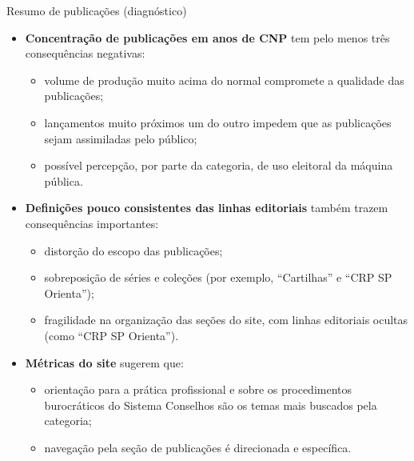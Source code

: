 \documentclass{beamer}
\begin{document}
\begin{frame}{Resumo de publicações (diagnóstico)}

	\scriptsize
	\begin{itemize}
	\item \textbf{Concentração de publicações em anos de CNP} tem pelo menos três consequências negativas:
		\begin{itemize}\scriptsize
			\item volume de produção muito acima do normal compromete a qualidade das publicações;
			\item lançamentos muito próximos um do outro impedem que as publicações sejam assimiladas pelo público;
			\item possível percepção, por parte da categoria, de uso eleitoral da máquina pública.
		\end{itemize}
	\item \textbf{Definições pouco consistentes das linhas editoriais} também trazem consequências importantes:
		\begin{itemize}\scriptsize
			\item distorção do escopo das publicações;
			\item sobreposição de séries e coleções (por exemplo, ``Cartilhas'' e ``CRP SP Orienta'');
			\item fragilidade na organização das seções do site, com linhas editoriais ocultas (como ``CRP SP Orienta'').
		\end{itemize}
	\item \textbf{Métricas do site} sugerem que:
		\begin{itemize}\scriptsize
			\item orientação para a prática profissional e sobre os procedimentos burocráticos do Sistema Conselhos são os temas mais buscados pela categoria;
			\item navegação pela seção de publicações é direcionada e específica.
		\end{itemize}
	\end{itemize}

\end{frame}
\end{document}
